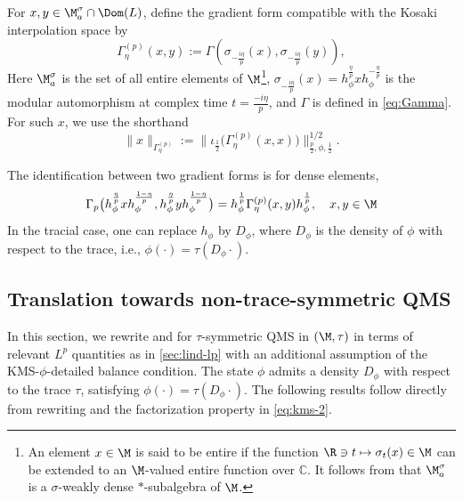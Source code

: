 \documentclass[sn-mathphys-num]{sn-jnl}
\begin{document}
\begin{definition}\label{def:GammaLp-k}
For $x,y\in \M_{a}^{\sigma}\cap\Dom(L)$, define the gradient form compatible with the Kosaki interpolation space by
\[
    \Gamma^{(p)}_{\eta}(x,y):= \Gamma(\sigma_{- \frac {i\eta} {p}}(x),\sigma_{- \frac {i\eta} {p}}(y)),
\]
Here $\M_{a}^{\sigma}$ is the set of all entire elements of $\M$\footnote{An element $x\in\M$ is said to be entire if the function $\R\ni t\mapsto \sigma_t(x)\in\M$ can be extended to an $\M$-valued entire function over $\mathbb{C}$. It follows from \cite[Lemma~2.3]{takesaki_theory_2003-2} that $\M_a^\sigma$ is a $\sigma$-weakly dense $*$-subalgebra of $\M$.}, $\sigma_{- \frac {i\eta} {p}}(x)=h_\phi^{\frac{\eta}{p}}xh_\phi^{-\frac{\eta}{p}}$ is the modular automorphism at complex time $t=\frac{-i\eta}{p}$, and $\Gamma$ is defined in \cref{eq:Gamma}.
For such $x$, we use the shorthand
\[
\|x\|_{\Gamma^{(p)}_\eta}
:=
\bigl\|\iota_{\frac12}\bigl(\Gamma^{(p)}_\eta(x,x)\bigr)\bigr\|_{\frac p2,\phi,\frac12}^{1/2}.
\]
\end{definition}
The identification between two gradient forms is for dense elements,
\[
\Gamma_{p}\big(h_\phi^{\frac{\eta}{p}} x h_\phi^{\frac{1-\eta}{p}},  h_\phi^{\frac{\eta}{p}} y h_\phi^{\frac{1-\eta}{p}}\big)
= h_\phi^{\frac{1}{p}}   \Gamma_{\eta}^{(p)}(x, y)   h_\phi^{\frac{1}{p}}, \quad  x,y\in\M
\]
In the tracial case, one can replace $h_\phi$ by $D_\phi$, where $D_\phi$ is the density of $\phi$ with respect to the trace, i.e., $\phi(\cdot) = \tau(D_\phi \cdot)$.
\subsection{Translation towards non-trace-symmetric QMS}
In this section, we rewrite  and  for $\tau$-symmetric QMS in $(\M,\tau)$ in terms of relevant $L^p$ quantities as in \cref{sec:lind-lp} with an additional assumption of the KMS-$\phi$-detailed balance condition. The state $\phi$ admits a density $D_\phi$ with respect to the trace $\tau$, satisfying $\phi(\cdot) = \tau(D_\phi \cdot)$.
 The following results follow directly from rewriting and the factorization property in \cref{eq:kms-2}.
\end{document}
